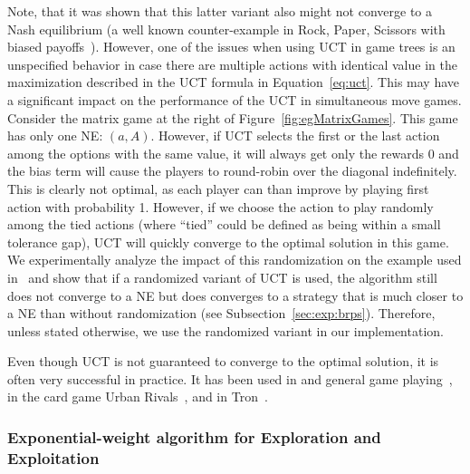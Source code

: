 Note, that it was shown that this latter variant also might not converge to a Nash equilibrium (a well known counter-example in Rock, Paper, Scissors with biased payoffs~\cite{Shafiei09}).
However, one of the issues when using UCT in game trees is an unspecified behavior in case there are multiple actions with identical value in the maximization described in the UCT formula in Equation~\ref{eq:uct}.
This may have a significant impact on the performance of the UCT in simultaneous move games.
Consider the matrix game at the right of Figure~\ref{fig:egMatrixGames}.
This game has only one NE: $(a,A)$. However, if UCT selects the first or the last action among the options with the same value, it will always get only the rewards 0 and the bias term will cause the players to round-robin over the diagonal indefinitely. This is clearly not optimal, as each player can than improve by playing first action with probability 1. However, if we choose the action to play randomly among the tied actions (where ``tied'' could be defined as being within a small tolerance gap), UCT will quickly converge to the optimal solution in this game.
We experimentally analyze the impact of this randomization on the example used in~\cite{Shafiei09} and show that if a randomized variant of UCT is used, the algorithm still does not converge to a NE but does converges to a strategy that is much closer to a NE than without randomization (see Subsection~\ref{sec:exp:brps}).
Therefore, unless stated otherwise, we use the randomized variant in our implementation.

Even though UCT is not guaranteed to converge to the optimal solution, it is often very successful in practice.
It has been used in and general game playing~\cite{Finnsson12}, in the card game Urban Rivals~\cite{Teytaud11Upper},
and in Tron~\cite{Perick12Comparison}.


\subsubsection{Exponential-weight algorithm for Exploration and Exploitation}\label{sec:exp3}

